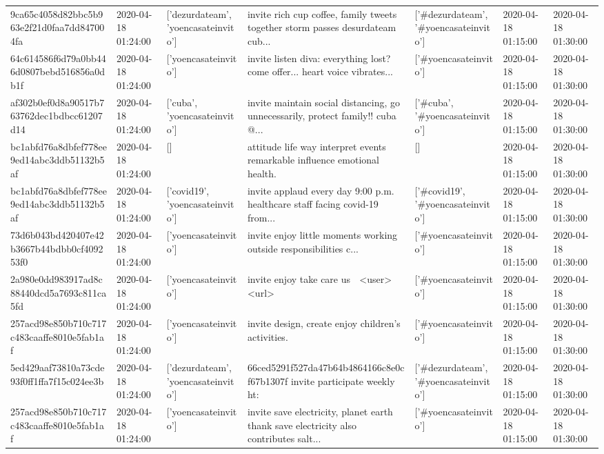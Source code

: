 \begin{tabular}{lllllll}
9ca65c4058d82bbc5b963e2f21d0faa7dd847004fa & 2020-04-18 01:24:00 & ['dezurdateam', 'yoencasateinvito'] & invite rich cup coffee, family tweets together storm passes desurdateam cub... & ['#dezurdateam', '#yoencasateinvito'] & 2020-04-18 01:15:00 & 2020-04-18 01:30:00 \\
64c614586f6d79a0bb446d0807bebd516856a0db1f & 2020-04-18 01:24:00 & ['yoencasateinvito'] & invite listen diva: everything lost? come offer... heart voice vibrates... & ['#yoencasateinvito'] & 2020-04-18 01:15:00 & 2020-04-18 01:30:00 \\
af302b0ef0d8a90517b763762dec1bdbcc61207d14 & 2020-04-18 01:24:00 & ['cuba', 'yoencasateinvito'] & invite maintain social distancing, go unnecessarily, protect family!!️ cuba @... & ['#cuba', '#yoencasateinvito'] & 2020-04-18 01:15:00 & 2020-04-18 01:30:00 \\
bc1abfd76a8dbfef778ee9ed14abc3ddb51132b5af & 2020-04-18 01:24:00 & [] & attitude life way interpret events remarkable influence emotional health. & [] & 2020-04-18 01:15:00 & 2020-04-18 01:30:00 \\
bc1abfd76a8dbfef778ee9ed14abc3ddb51132b5af & 2020-04-18 01:24:00 & ['covid19', 'yoencasateinvito'] & invite applaud every day 9:00 p.m. healthcare staff facing covid-19 from... & ['#covid19', '#yoencasateinvito'] & 2020-04-18 01:15:00 & 2020-04-18 01:30:00 \\
73d6b043bd420407e42b3667b44bdbb0cf409253f0 & 2020-04-18 01:24:00 & ['yoencasateinvito'] & invite enjoy little moments working outside responsibilities c... & ['#yoencasateinvito'] & 2020-04-18 01:15:00 & 2020-04-18 01:30:00 \\
2a980e0dd983917ad8c88440dcd5a7693c811ca5fd & 2020-04-18 01:24:00 & ['yoencasateinvito'] & invite enjoy take care us 🌹 <user> <url> & ['#yoencasateinvito'] & 2020-04-18 01:15:00 & 2020-04-18 01:30:00 \\
257acd98e850b710c717c483caaffe8010e5fab1af & 2020-04-18 01:24:00 & ['yoencasateinvito'] & invite design, create enjoy children's activities. & ['#yoencasateinvito'] & 2020-04-18 01:15:00 & 2020-04-18 01:30:00 \\
5ed429aaf73810a73cde93f0ff1ffa7f15c024ee3b & 2020-04-18 01:24:00 & ['dezurdateam', 'yoencasateinvito'] & 66ced5291f527da47b64b4864166c8e0cf67b1307f invite participate weekly ht: & ['#dezurdateam', '#yoencasateinvito'] & 2020-04-18 01:15:00 & 2020-04-18 01:30:00 \\
257acd98e850b710c717c483caaffe8010e5fab1af & 2020-04-18 01:24:00 & ['yoencasateinvito'] & invite save electricity, planet earth thank save electricity also contributes salt... & ['#yoencasateinvito'] & 2020-04-18 01:15:00 & 2020-04-18 01:30:00 \\

\end{tabular}
